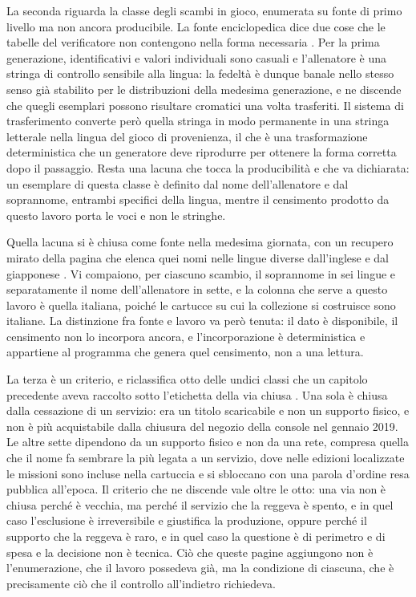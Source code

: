 La seconda riguarda la classe degli scambi in gioco, enumerata su fonte di primo livello ma non ancora producibile. La fonte enciclopedica dice due cose che le tabelle del verificatore non contengono nella forma necessaria \cite{bulbapedia-in-game-trade}. Per la prima generazione, identificativi e valori individuali sono casuali e l'allenatore è una stringa di controllo sensibile alla lingua: la fedeltà è dunque banale nello stesso senso già stabilito per le distribuzioni della medesima generazione, e ne discende che quegli esemplari possono risultare cromatici una volta trasferiti. Il sistema di trasferimento converte però quella stringa in modo permanente in una stringa letterale nella lingua del gioco di provenienza, il che è una trasformazione deterministica che un generatore deve riprodurre per ottenere la forma corretta dopo il passaggio. Resta una lacuna che tocca la producibilità e che va dichiarata: un esemplare di questa classe è definito dal nome dell'allenatore e dal soprannome, entrambi specifici della lingua, mentre il censimento prodotto da questo lavoro porta le voci e non le stringhe.

Quella lacuna si è chiusa come fonte nella medesima giornata, con un recupero mirato della pagina che elenca quei nomi nelle lingue diverse dall'inglese e dal giapponese \cite{bulbapedia-scambi-lingue}. Vi compaiono, per ciascuno scambio, il soprannome in sei lingue e separatamente il nome dell'allenatore in sette, e la colonna che serve a questo lavoro è quella italiana, poiché le cartucce su cui la collezione si costruisce sono italiane. La distinzione fra fonte e lavoro va però tenuta: il dato è disponibile, il censimento non lo incorpora ancora, e l'incorporazione è deterministica e appartiene al programma che genera quel censimento, non a una lettura.

La terza è un criterio, e riclassifica otto delle undici classi che un capitolo precedente aveva raccolto sotto l'etichetta della via chiusa \cite{bulbapedia-vie-chiuse}. Una sola è chiusa dalla cessazione di un servizio: era un titolo scaricabile e non un supporto fisico, e non è più acquistabile dalla chiusura del negozio della console nel gennaio 2019. Le altre sette dipendono da un supporto fisico e non da una rete, compresa quella che il nome fa sembrare la più legata a un servizio, dove nelle edizioni localizzate le missioni sono incluse nella cartuccia e si sbloccano con una parola d'ordine resa pubblica all'epoca. Il criterio che ne discende vale oltre le otto: una via non è chiusa perché è vecchia, ma perché il servizio che la reggeva è spento, e in quel caso l'esclusione è irreversibile e giustifica la produzione, oppure perché il supporto che la reggeva è raro, e in quel caso la questione è di perimetro e di spesa e la decisione non è tecnica. Ciò che queste pagine aggiungono non è l'enumerazione, che il lavoro possedeva già, ma la condizione di ciascuna, che è precisamente ciò che il controllo all'indietro richiedeva.

